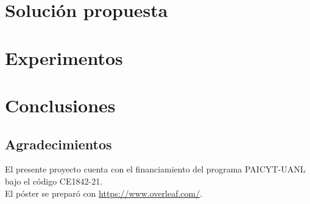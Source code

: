 \documentclass[a0]{sciposter} %
\begin{document}
\begin{multicols}{2}
\section{Solución propuesta}


\section{Experimentos}


\section{Conclusiones}

\subsection*{Agradecimientos}

El presente proyecto cuenta con el financiamiento del programa PAICYT-UANL bajo el código CE1842-21.\\
El póster se preparó con \url{https://www.overleaf.com/}.


\end{multicols}



\end{document}
